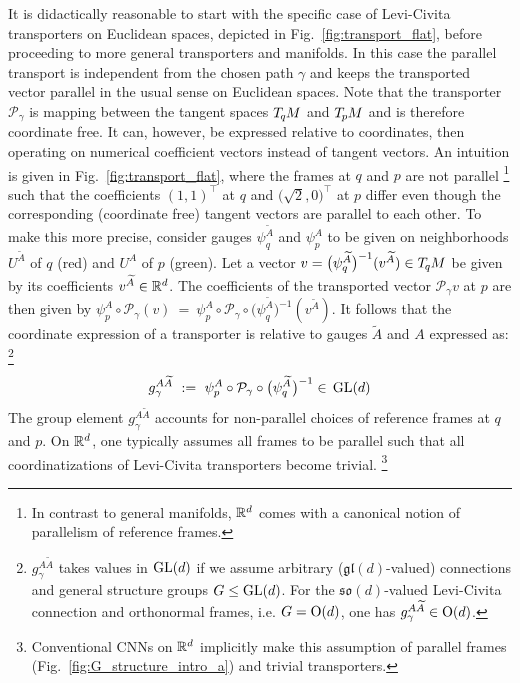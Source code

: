 It is didactically reasonable to start with the specific case of Levi-Civita transporters on Euclidean spaces, depicted in Fig.~\ref{fig:transport_flat}, before proceeding to more general transporters and manifolds.
In this case the parallel transport is independent from the chosen path $\gamma$ and keeps the transported vector parallel in the usual sense on Euclidean spaces.
Note that the transporter~$\mathcal{P}_\gamma$ is mapping between the tangent spaces $T_{\mkern-1.5mu q}\mkern-.5muM$ and $T_{\mkern-1.5mu p}\mkern-.5muM$ and is therefore coordinate free.
It can, however, be expressed relative to coordinates, then operating on numerical coefficient vectors instead of tangent vectors.
An intuition is given in Fig.~\ref{fig:transport_flat}, where the frames at $q$ and $p$ are not parallel%
\footnote{
    In contrast to general manifolds, $\mathbb{R}^d$ comes with a canonical notion of parallelism of reference frames.
}
such that the coefficients $(1,1)^\top$ at $q$ and $\big(\sqrt{2},0\big)^\top$ at $p$ differ even though the corresponding (coordinate free) tangent vectors are parallel to each other.
To make this more precise, consider gauges $\psi_q^{\widetilde{A}}$ and $\psi_p^A$ to be given on neighborhoods $U^{\widetilde{A}}$ of $q$ (red) and $U^A$ of $p$ (green).
Let a vector $v = \big( \psi_q^{\widetilde{A}} \big)^{-1} (v^{\widetilde{A}}) \in T_{\mkern-1.5mu q}\mkern-.5muM$ be given by its coefficients $v^{\widetilde{A}} \in \mathbb{R}^d$.
The coefficients of the transported vector $\mathcal{P}_\gamma v$ at $p$ are then given by
$
\psi_p^A \circ \mathcal{P}_\gamma (v)
\ =\ \psi_p^A \circ \mathcal{P}_\gamma \circ \big(\psi_q^{\widetilde{A}}\big)^{-1} (v^{\widetilde{A}})
$.
It follows that the coordinate expression of a transporter is relative to gauges $\widetilde{A}$ and $A$ expressed as:%
\footnote{
    $g_\gamma^{A\widetilde{A}}$ takes values in $\operatorname{GL}(d)$ if we assume arbitrary ($\mathfrak{gl}(d)$-valued) connections and general structure groups $G\leq\operatorname{GL}(d)$.
    For the $\mathfrak{so}(d)$-valued Levi-Civita connection and orthonormal frames, i.e. $G=\operatorname{O}(d)$, one has $g_\gamma^{A\widetilde{A}} \in \operatorname{O}(d)$.
}
\begin{align}\label{eq:transporter_gauge}
    g_\gamma^{A\widetilde{A}} \ :=\ \psi_p^A \circ \mathcal{P}_\gamma \circ \big( \psi_q^{\widetilde{A}} \mkern1mu\big)^{-1} \in\, \operatorname{GL}(d)
\end{align}
The group element $g_\gamma^{A\widetilde{A}}$ accounts for non-parallel choices of reference frames at $q$ and $p$.
On $\mathbb{R}^d$, one typically assumes all frames to be parallel such that all coordinatizations of Levi-Civita transporters become trivial.%
\footnote{
    Conventional CNNs on $\mathbb{R}^d$ implicitly make this assumption of parallel frames (Fig.~\ref{fig:G_structure_intro_a}) and trivial transporters.
}

